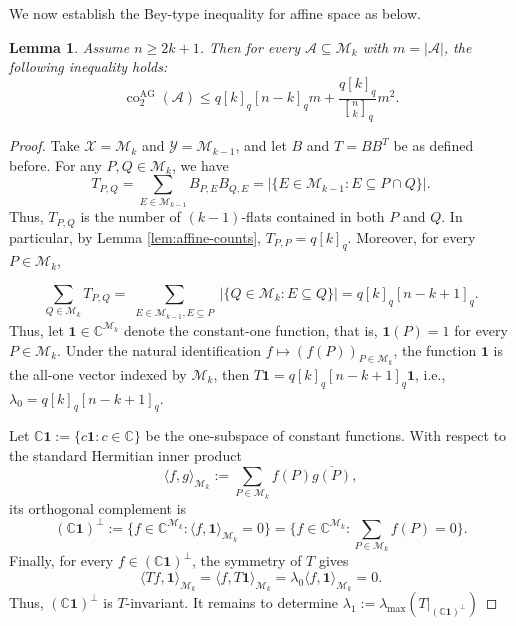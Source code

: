 \documentclass[11pt]{article}
\newtheorem{lemma}{Lemma}
\theoremstyle{definition}
\newcommand{\qbinom}[2]{\genfrac{[}{]}{0pt}{}{#1}{#2}_q}
\newcommand{\co}{\operatorname{co}_2}
\begin{document}
We now establish the Bey-type inequality for affine space as below.

\begin{lemma}\label{lem:affine-bey}
Assume $n\ge2k+1$. Then for every $\mathcal A\subseteq\mathcal M_k$ with $m=|\mathcal A|$, the following inequality holds:
\[
    \co^{\mathrm{AG}}(\mathcal A)
\le q[k]_q[n-k]_qm+\frac{q[k]_q}{\qbinom{n}{k}}m^2.
\]
\end{lemma}

\begin{proof}
Take $\mathscr{X}=\mathcal M_k$ and $\mathscr{Y}=\mathcal M_{k-1}$, and let $B$ and $T=BB^T$ be as defined before. For any $P,Q\in \mathcal{M}_k$, we have
\[
T_{P,Q}=\sum\limits_{E\in \mathcal M_{k-1}}B_{P,E}B_{Q,E}=|\{E\in\mathcal M_{k-1}: E\subseteq P\cap Q\}|.
\]
Thus, $T_{P,Q}$ is the number of $(k-1)$-flats contained in both $P$ and $Q$. In particular, by Lemma \ref{lem:affine-counts}, $T_{P,P}=q[k]_q$. Moreover, for every $P\in\mathcal M_k$,

\[
  \sum_{Q \in \mathcal M_k} T_{P,Q} 
= \sum_{\substack{E \in \mathcal M_{k-1}, E \subseteq P}} 
  |\{Q \in \mathcal M_k : E \subseteq Q\}|
= q[k]_q[n - k + 1]_q.
\]
Thus, let $\mathbf{1}\in \mathbb{C}^{\mathcal{M}_k}$ denote the constant-one function, that is, $\mathbf{1}(P)=1$ for every $P\in\mathcal{M}_k$. Under the natural identification $f \mapsto (f(P))_{P \in \mathcal{M}_k}$, the function $\mathbf{1}$ is the all-one vector indexed by $\mathcal M_k$, then $T\mathbf 1=q[k]_q[n-k+1]_q\mathbf 1$, i.e., $\lambda_0=q[k]_q[n-k+1]_q$. 

Let $\mathbb{C}\mathbf{1} := \{c\mathbf{1} : c \in \mathbb{C}\}$ be the one-subspace of constant functions. With respect to the standard Hermitian inner product 
\[\langle f, g \rangle_{\mathcal{M}_k} := \sum_{P \in \mathcal{M}_k} f(P) \overline{g(P)},\]
its orthogonal complement is  
\[(\mathbb{C}\mathbf{1})^\perp := \{f \in \mathbb{C}^{\mathcal{M}_k} : \langle f, \mathbf{1} \rangle_{\mathcal{M}_k} = 0\}=\bigg\{ f \in \mathbb{C}^{\mathcal{M}_k} : \sum_{P \in \mathcal{M}_k} f(P) = 0 \bigg\}.\]
Finally, for every $f\in(\mathbb{C}\mathbf{1})^\perp$, the symmetry of $T$ gives
\[
    \langle Tf,\mathbf{1}\rangle_{\mathcal{M}_k}=\langle f,T\mathbf{1}\rangle_{\mathcal{M}_k}=\lambda_0\langle f,\mathbf{1}\rangle_{\mathcal{M}_k}=0.
\]
Thus, $(\mathbb{C}\mathbf{1})^\perp$ is $T$-invariant. It remains to determine $\lambda_1 := \lambda_{\text{max}} \left( T |_{(\mathbb{C}\mathbf{1})^\perp} \right)$


\end{proof}
\end{document}
